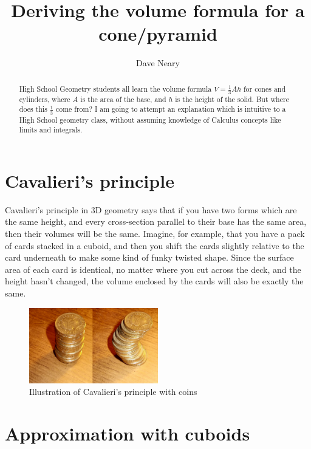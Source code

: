 \documentclass{article}
\title{Deriving the volume formula for a cone/pyramid}
\author{Dave Neary}
\begin{document}
\maketitle

\begin{abstract}
High School Geometry students all learn the volume formula $V=\frac{1}{3}Ah$ for cones
and cylinders, where $A$ is the area of the base, and $h$ is the height of the solid. But
where does this $\frac{1}{3}$ come from?
I am going to attempt an explanation which is intuitive to a High School geometry class,
without assuming knowledge of Calculus concepts like limits and integrals.
\end{abstract}

\section*{Cavalieri's principle}

Cavalieri's principle in 3D geometry says that if you have two forms which are the same height,
and every cross-section parallel to their base has the same area, then their volumes will be
the same. Imagine, for example, that you have a pack of cards stacked in a cuboid, and then
you shift the cards slightly relative to the card underneath to make some kind of funky
twisted shape. Since the surface area of each card is identical, no matter where you cut
across the deck, and the height hasn't changed, the volume enclosed by the cards will also
be exactly the same.

\begin{figure}[h]
\centering
	\includegraphics[width=0.5\textwidth]{Cavalieris_principle_illustration}
	\caption{Illustration of Cavalieri's principle with coins\protect\footnotemark}
\end{figure}


\section*{Approximation with cuboids}
\end{document}

